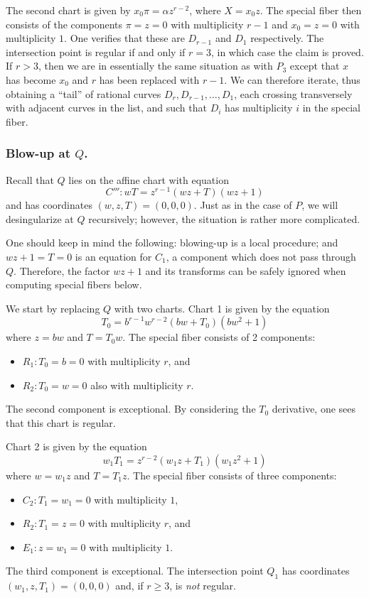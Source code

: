 \documentclass{article}
\theoremstyle{plain}
\theoremstyle{definition}
\theoremstyle{remark}
\begin{document}
  The second chart is given by $x_0 \pi = \alpha z^{r-2}$, where $X = x_0 z$. The special fiber then consists of the components $\pi = z = 0$ with multiplicity $r-1$ and $x_0 = z = 0$ with multiplicity $1$. One verifies that these are $D_{r-1}$ and $D_1$ respectively. The intersection point is regular if and only if $r = 3$, in which case the claim is proved. If $r > 3$, then we are in essentially the same situation as with $P_3$ except that $x$ has become $x_0$ and $r$ has been replaced with $r-1$. We can therefore iterate, thus obtaining a ``tail'' of rational curves $D_r, D_{r-1}, \dots, D_1$, each crossing transversely with adjacent curves in the list, and such that $D_i$ has multiplicity $i$ in the special fiber.


\subsubsection{Blow-up at $Q$.}
\label{sec:blow-up-Q}

Recall that $Q$ lies on the affine chart with equation
\begin{equation}
  C''':wT = z^{r-1}(wz + T)(wz + 1)\label{eq:C'''}
\end{equation}
and has coordinates $(w,z,T) = (0,0,0)$. Just as in the case of $P$, we will desingularize at $Q$ recursively; however, the situation is rather more complicated.  

One should keep in mind the following: blowing-up is a local procedure; and $wz + 1 = T = 0$ is an equation for $C_1$, a component which does not pass through $Q$. Therefore, the factor $wz + 1$ and its transforms can be safely ignored when computing special fibers below.

We start by replacing $Q$ with two charts. Chart 1 is given by the equation
\[
T_0 = b^{r-1}w^{r-2}(bw + T_0)(bw^2 + 1)
\]
where $z = bw$ and $T = T_0w$. The special fiber consists of 2 components:
\begin{itemize}
    \item $R_1: T_0 = b = 0$ with multiplicity $r$, and
    \item $R_2: T_0 = w = 0$ also with multiplicity $r$.
\end{itemize}
 The second component is exceptional. By considering the $T_0$ derivative, one sees that this chart is regular.

Chart 2 is given by the equation
\[
w_1 T_1 = z^{r-2}(w_1z + T_1)(w_1 z^2 + 1)
\]
where $w = w_1 z$ and $T = T_1 z$. The special fiber consists of three components:
\begin{itemize}
    \item $C_2: T_1 = w_1 = 0$ with multiplicity $1$,
    \item $R_2: T_1 = z = 0$ with multiplicity $r$, and
    \item $E_1: z = w_1 = 0$ with multiplicity $1$.
\end{itemize}
The third component is exceptional. The intersection point $Q_1$ has coordinates $(w_1, z, T_1) = (0,0,0)$ and, if $r \geq 3$, is \emph{not} regular.
\end{document}
